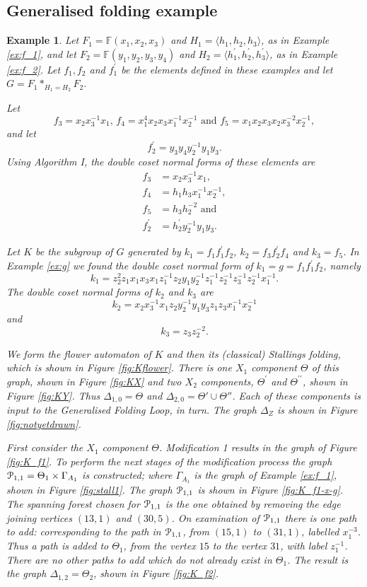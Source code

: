 \documentclass[a4paper,12pt]{article}
\newcommand{\G}{\Gamma }
\newcommand{\D}{\Delta }
\newcommand{\T}{\Theta }
\newcommand{\cP}{{\cal{P}}}
\newtheorem{exam}[theorem]{Example}
\newenvironment{example}{\begin{exam} \rm}{\end{exam}}
\numberwithin{equation}{section}
\numberwithin{figure}{section}
\newcommand{\FF}{\ensuremath{\mathbb{F}}}
\newcommand{\la}{\langle}
\newcommand{\ra}{\rangle}
\begin{document}
\subsection{Generalised folding example}
\begin{example}\label{ex:K}
Let $F_1=\FF(x_1,x_2,x_3)$ and $H_1=\la h_1,h_2,h_3\ra$,
as in Example \ref{ex:f_1}, and let $F_2=\FF(y_1,y_2,y_3,y_4)$ and
$H_2=\la h_1^\prime, h_2^\prime, h_3^\prime\ra$, as in Example \ref{ex:f_2}.
Let $f_1,f_2$ and $f_1^\prime$ be the elements defined in these examples
 and let $G=F_1\ast_{H_1=H_2} F_2$.

Let
\[f_3=x_2x_3^{-1}x_1,\, f_4= x_1^4 x_2 x_3 x_1^{-1} x_2^{-1}
\textrm{ and } f_5=x_1x_2x_3x_2x_3^{-2}x_2^{-1},\]
and let
\[ f_2^\prime =y_3y_4y_2^{-1}y_1y_3.\]
Using Algorithm I, the double coset normal forms of these elements are
\begin{align*}
f_3 & = x_2x_3^{-1}x_1,\\
f_4 &= h_1h_3 x_1^{-1}x_2^{-1},\\
f_5 &= h_3h_2^{-2}\textrm{ and }\\
f_2^\prime &= h_2^\prime y_2^{-1}y_1y_3.
\end{align*}

Let $K$ be the subgroup of $G$ generated by $k_1=f_1f_1^\prime f_2$,
$k_2= f_3f_2^\prime f_4$ and $k_3=f_5$.
In Example \ref{ex:g} we found the double coset normal form of
$k_1=g=f_1f_1^\prime f_2$, namely
\[k_1=z_2^2 z_1  x_1 x_3 x_1 z_1^{-1}
z_2y_1y_2^{-1} z_1^{-1}z_2^{-1}
z_3^{-1}z_2^{-1} x_1^{-1}.\]
The double coset normal forms of $k_2$ and $k_3$ are
\[k_2=  x_2x_3^{-1}x_1  z_2 y_2^{-1}y_1y_3 z_1z_3 x_1^{-1}x_2^{-1}\]
and
\[k_3 = z_3z_2^{-2}.\]

We form the flower automaton of $K$ and then its (classical) Stallings folding,
which is
shown in Figure \ref{fig:Kflower}.
There is one $X_1$ component $\Theta$ of this graph, shown in Figure \ref{fig:KX}
and two $X_2$ components, $\Theta^\prime$ and $\Theta^{\prime\prime}$,
shown in Figure \ref{fig:KY}. Thus $\D_{1,0}=\Theta$ and 
$\D_{2,0}=\T'\cup \T''$. Each of these components is input to
 the Generalised Folding Loop, in turn.  The graph $\D_Z$ is shown
in Figure \ref{fig:notyetdrawn}.

First consider the $X_1$ component $\Theta$. Modification 1
results in the graph of Figure \ref{fig:K_f1}. To perform the next
stages of the  modification process the graph  $\cP_{1,1}=\Theta_1 \times
\G_{A_1}$ is constructed; where $\G_{A_1}$ is the graph of Example
\ref{ex:f_1}, shown in Figure \ref{fig:stall1}. The  graph
$\cP_{1,1}$ is shown in Figure \ref{fig:K_f1-x-g}. The spanning forest
chosen for $\cP_{1,1}$ is the one obtained by removing the edge
joining vertices $(13,1)$ and $(30,5)$. On examination of $\cP_{1,1}$
there is one path to add: corresponding to the path in $\cP_{1,1}$,
from $(15,1)$ to $(31,1)$, labelled $x_1^{-3}$. Thus a path is
added to $\T_1$, from the vertex $15$ to the vertex $31$, with
label $z_1^{-1}$. There are no other paths to add which do not
already exist in $\T_1$. The result is  the graph $\D_{1,2}=\Theta_2$,
shown in Figure \ref{fig:K_f2}. 


\end{example}
\end{document}
